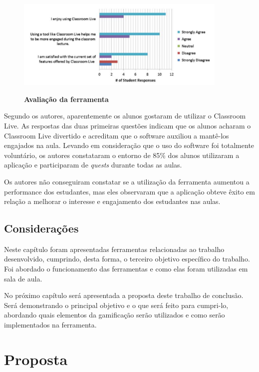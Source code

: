 \documentclass[
	12pt,				%
	oneside,			%
	a4paper,			%
	english,			%
	french,				%
	spanish,			%
	brazil,				%
	]{abntex2}
\begin{document}
\begin{figure}[ht]
\centering
\caption{\textbf{Avaliação da ferramenta}}
\includegraphics[width=0.9\textwidth]{imagens/classroom_avaliacao.png}
\label{fig:classroom_avaliacao}
\end{figure}

Segundo os autores, aparentemente os alunos gostaram de utilizar o Classroom Live. As respostas das duas primeiras questões indicam que os alunos acharam o Classroom Live divertido e acreditam que o software auxiliou a mantê-los engajados na aula. Levando em consideração que o uso do software foi totalmente voluntário, os autores constataram o entorno de 85\% dos alunos utilizaram a aplicação e participaram de \textit{quests} durante todas as aulas. 

Os autores não conseguiram constatar se a utilização da ferramenta aumentou a performance dos estudantes, mas eles observaram que a aplicação obteve êxito em relação a melhorar o interesse e engajamento dos estudantes nas aulas.

\section{Considerações}
Neste capítulo foram apresentadas ferramentas relacionadas ao trabalho desenvolvido, cumprindo, desta forma, o terceiro objetivo específico do trabalho. Foi abordado o funcionamento das ferramentas e como elas foram utilizadas em sala de aula.

No próximo capítulo será apresentada a proposta deste trabalho de conclusão. Será demonstrando o principal objetivo e o que será feito para cumpri-lo, abordando quais elementos da gamificação serão utilizados e como serão implementados na ferramenta.

\chapter{Proposta} 
\end{document}

